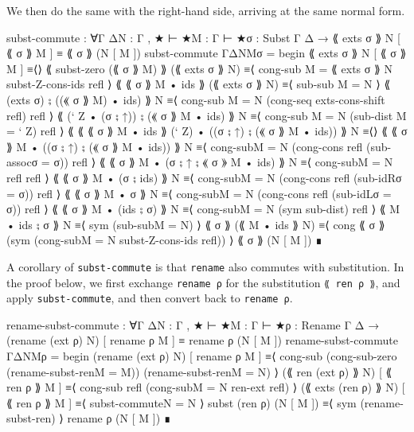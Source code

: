 We then do the same with the right-hand side, arriving at the same
normal form.

\begin{fence}
\begin{code}
subst-commute : ∀{Γ Δ}{N : Γ , ★ ⊢ ★}{M : Γ ⊢ ★}{σ : Subst Γ Δ }
    → ⟪ exts σ ⟫ N [ ⟪ σ ⟫ M ] ≡ ⟪ σ ⟫ (N [ M ])
subst-commute {Γ}{Δ}{N}{M}{σ} =
     begin
       ⟪ exts σ ⟫ N [ ⟪ σ ⟫ M ]
     ≡⟨⟩
       ⟪ subst-zero (⟪ σ ⟫ M) ⟫ (⟪ exts σ ⟫ N)
     ≡⟨ cong-sub {M = ⟪ exts σ ⟫ N} subst-Z-cons-ids refl ⟩
       ⟪ ⟪ σ ⟫ M • ids ⟫ (⟪ exts σ ⟫ N)
     ≡⟨ sub-sub {M = N} ⟩
       ⟪ (exts σ) ⨟ ((⟪ σ ⟫ M) • ids) ⟫ N
     ≡⟨ cong-sub {M = N} (cong-seq exts-cons-shift refl) refl ⟩
       ⟪ (` Z • (σ ⨟ ↑)) ⨟ (⟪ σ ⟫ M • ids) ⟫ N
     ≡⟨ cong-sub {M = N} (sub-dist {M = ` Z}) refl ⟩
       ⟪ ⟪ ⟪ σ ⟫ M • ids ⟫ (` Z) • ((σ ⨟ ↑) ⨟ (⟪ σ ⟫ M • ids)) ⟫ N
     ≡⟨⟩
       ⟪ ⟪ σ ⟫ M • ((σ ⨟ ↑) ⨟ (⟪ σ ⟫ M • ids)) ⟫ N
     ≡⟨ cong-sub{M = N} (cong-cons refl (sub-assoc{σ = σ})) refl ⟩
       ⟪ ⟪ σ ⟫ M • (σ ⨟ ↑ ⨟ ⟪ σ ⟫ M • ids) ⟫ N
     ≡⟨ cong-sub{M = N} refl refl ⟩
       ⟪ ⟪ σ ⟫ M • (σ ⨟ ids) ⟫ N
     ≡⟨ cong-sub{M = N} (cong-cons refl (sub-idR{σ = σ})) refl ⟩
       ⟪ ⟪ σ ⟫ M • σ ⟫ N
     ≡⟨ cong-sub{M = N} (cong-cons refl (sub-idL{σ = σ})) refl ⟩
       ⟪ ⟪ σ ⟫ M • (ids ⨟ σ) ⟫ N
     ≡⟨ cong-sub{M = N} (sym sub-dist) refl ⟩
       ⟪ M • ids ⨟ σ ⟫ N
     ≡⟨ sym (sub-sub{M = N}) ⟩
       ⟪ σ ⟫ (⟪ M • ids ⟫ N)
     ≡⟨ cong ⟪ σ ⟫ (sym (cong-sub{M = N} subst-Z-cons-ids refl)) ⟩
       ⟪ σ ⟫ (N [ M ])
     ∎
\end{code}
\end{fence}

A corollary of \texttt{subst-commute} is that \texttt{rename} also
commutes with substitution. In the proof below, we first exchange
\texttt{rename\ ρ} for the substitution \texttt{⟪\ ren\ ρ\ ⟫}, and apply
\texttt{subst-commute}, and then convert back to \texttt{rename\ ρ}.

\begin{fence}
\begin{code}
rename-subst-commute : ∀{Γ Δ}{N : Γ , ★ ⊢ ★}{M : Γ ⊢ ★}{ρ : Rename Γ Δ }
    → (rename (ext ρ) N) [ rename ρ M ] ≡ rename ρ (N [ M ])
rename-subst-commute {Γ}{Δ}{N}{M}{ρ} =
     begin
       (rename (ext ρ) N) [ rename ρ M ]
     ≡⟨ cong-sub (cong-sub-zero (rename-subst-ren{M = M}))
                 (rename-subst-ren{M = N}) ⟩
       (⟪ ren (ext ρ) ⟫ N) [ ⟪ ren ρ ⟫ M ]
     ≡⟨ cong-sub refl (cong-sub{M = N} ren-ext refl) ⟩
       (⟪ exts (ren ρ) ⟫ N) [ ⟪ ren ρ ⟫ M ]
     ≡⟨ subst-commute{N = N} ⟩
       subst (ren ρ) (N [ M ])
     ≡⟨ sym (rename-subst-ren) ⟩
       rename ρ (N [ M ])
     ∎
\end{code}
\end{fence}

